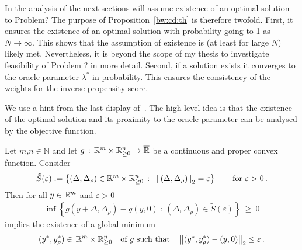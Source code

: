 \begin{remark}
  In the analysis of the next sections will assume existence of an optimal solution to Problem?
  The purpose of Proposition~\ref{bw:cd:th} is therefore twofold. 
  First, it ensures the existence of an optimal solution with probability going to 1 as $N\to\infty$.
  This shows that the assumption of existence is (at least for large $N$) likely met.
  Nevertheless, it is beyond the scope of my thesis to investigate feasibility of Problem ? in more detail. 
  Second, if a solution exists it converges to the oracle parameter $\lambda^*$ in probability. This ensures the consistency of the weights for the inverse propensity score.
\end{remark}

We use a hint from the last display of~\cite[p.22]{Wang2019}.
The high-level idea is that the existence of the optimal solution and its proximity to the oracle parameter can be analysed by the objective function.
\begin{lemma}
  Let $m$,$n\in\mathbb{N}$ and let 
  $
  g \,:\, \mathbb{R}^m\times \mathbb{R}^n_{\ge 0} \to \overline{\mathbb{R}}
  $ 
  be a continuous and proper convex function.
  Consider 
  \begin{gather*}
    \tilde{S}(\varepsilon)
    :=
    \left\{ 
      (
      \Delta,
      \Delta_\rho
      )
      \in
      \R^m \times \R^n_{\ge 0}
      \ 
      \colon
      \ 
      \norm{
      (
      \Delta,
      \Delta_\rho
      )
      }_2
      =
      \varepsilon
    \right\}
    \qquad
    \text{for}
    \ 
    \varepsilon>0
    \,.
  \end{gather*}
Then 
  for all $y \in \mathbb{R}^m$ and $\varepsilon>0$ 
    \begin{gather}
      \label{696}
      \inf 
      \left\{ 
        g(y+
        \Delta,\Delta_\rho)
        -
        g(y,0)
      \ 
        \colon
      \ 
      (
      \Delta,
      \Delta_\rho
      )
      \in
    \tilde{S}(\varepsilon)
      \right\}
      \ 
      \ge
      \ 
      0
    \end{gather}
    implies
    the existence of  
    a global minimum
    \begin{gather*}
    (
    y^*
    ,
    y^*_\rho
    )
    \in \,\mathbb{R}^m\times\mathbb{R}^n_{\ge 0}
    \quad
    \text{of $g$ such that}\quad
      \left\lVert
    (
    y^*
    ,
    y^*_\rho
    )
      - (y,0)\right\rVert_2 \le \varepsilon
      \,.
    \end{gather*}
\end{lemma}
